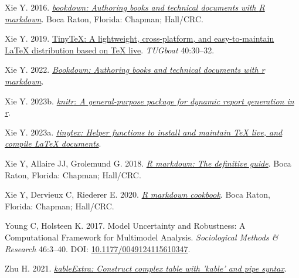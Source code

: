 \documentclass[10pt,a4paper]{article}
\newlength{\cslhangindent}
\newlength{\cslentryspacingunit} %
\newenvironment{CSLReferences}[2] %
 {%
  \setlength{\parindent}{0pt}
  \ifodd #1
  \let\oldpar\par
  \def\par{\hangindent=\cslhangindent\oldpar}
  \fi
  \setlength{\parskip}{#2\cslentryspacingunit}
 }%
 {}
\begin{document}
\begin{CSLReferences}{1}{0}
Xie Y. 2016. \emph{\href{https://bookdown.org/yihui/bookdown}{{bookdown}: Authoring books and technical documents with {R} markdown}}. Boca Raton, Florida: Chapman; Hall/CRC.

Xie Y. 2019. \href{https://tug.org/TUGboat/Contents/contents40-1.html}{{TinyTeX}: A lightweight, cross-platform, and easy-to-maintain LaTeX distribution based on TeX live}. \emph{TUGboat} 40:30--32.

Xie Y. 2022. \emph{\href{https://CRAN.R-project.org/package=bookdown}{Bookdown: Authoring books and technical documents with r markdown}}.

Xie Y. 2023b. \emph{\href{https://yihui.org/knitr/}{{knitr}: A general-purpose package for dynamic report generation in r}}.

Xie Y. 2023a. \emph{\href{https://github.com/rstudio/tinytex}{{tinytex}: Helper functions to install and maintain TeX live, and compile LaTeX documents}}.

Xie Y, Allaire JJ, Grolemund G. 2018. \emph{\href{https://bookdown.org/yihui/rmarkdown}{R markdown: The definitive guide}}. Boca Raton, Florida: Chapman; Hall/CRC.

Xie Y, Dervieux C, Riederer E. 2020. \emph{\href{https://bookdown.org/yihui/rmarkdown-cookbook}{R markdown cookbook}}. Boca Raton, Florida: Chapman; Hall/CRC.

Young C, Holsteen K. 2017. Model {Uncertainty} and {Robustness}: {A} {Computational} {Framework} for {Multimodel} {Analysis}. \emph{Sociological Methods \& Research} 46:3--40. DOI: \href{https://doi.org/10.1177/0049124115610347}{10.1177/0049124115610347}.

Zhu H. 2021. \emph{\href{https://CRAN.R-project.org/package=kableExtra}{kableExtra: Construct complex table with 'kable' and pipe syntax}}.

\end{CSLReferences}
\end{document}
